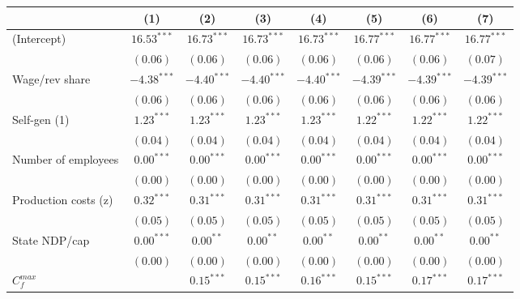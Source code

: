 
\begin{tabular}{l c c c c c c c }
\toprule
 & (1) & (2) & (3) & (4) & (5) & (6) & (7) \\
\midrule
(Intercept)                            & $16.53^{***}$ & $16.73^{***}$ & $16.73^{***}$ & $16.73^{***}$ & $16.77^{***}$ & $16.77^{***}$ & $16.77^{***}$ \\
                                       & $(0.06)$      & $(0.06)$      & $(0.06)$      & $(0.06)$      & $(0.06)$      & $(0.06)$      & $(0.07)$      \\
Wage/rev share                         & $-4.38^{***}$ & $-4.40^{***}$ & $-4.40^{***}$ & $-4.40^{***}$ & $-4.39^{***}$ & $-4.39^{***}$ & $-4.39^{***}$ \\
                                       & $(0.06)$      & $(0.06)$      & $(0.06)$      & $(0.06)$      & $(0.06)$      & $(0.06)$      & $(0.06)$      \\
Self-gen (1)                           & $1.23^{***}$  & $1.23^{***}$  & $1.23^{***}$  & $1.23^{***}$  & $1.22^{***}$  & $1.22^{***}$  & $1.22^{***}$  \\
                                       & $(0.04)$      & $(0.04)$      & $(0.04)$      & $(0.04)$      & $(0.04)$      & $(0.04)$      & $(0.04)$      \\
Number of employees                    & $0.00^{***}$  & $0.00^{***}$  & $0.00^{***}$  & $0.00^{***}$  & $0.00^{***}$  & $0.00^{***}$  & $0.00^{***}$  \\
                                       & $(0.00)$      & $(0.00)$      & $(0.00)$      & $(0.00)$      & $(0.00)$      & $(0.00)$      & $(0.00)$      \\
Production costs (z)                   & $0.32^{***}$  & $0.31^{***}$  & $0.31^{***}$  & $0.31^{***}$  & $0.31^{***}$  & $0.31^{***}$  & $0.31^{***}$  \\
                                       & $(0.05)$      & $(0.05)$      & $(0.05)$      & $(0.05)$      & $(0.05)$      & $(0.05)$      & $(0.05)$      \\
State NDP/cap                          & $0.00^{***}$  & $0.00^{**}$   & $0.00^{**}$   & $0.00^{**}$   & $0.00^{**}$   & $0.00^{**}$   & $0.00^{**}$   \\
                                       & $(0.00)$      & $(0.00)$      & $(0.00)$      & $(0.00)$      & $(0.00)$      & $(0.00)$      & $(0.00)$      \\
$C^{max}_{f}$                          &               & $0.15^{***}$  & $0.15^{***}$  & $0.16^{***}$  & $0.15^{***}$  & $0.17^{***}$  & $0.17^{***}$  \\

\end{tabular}
